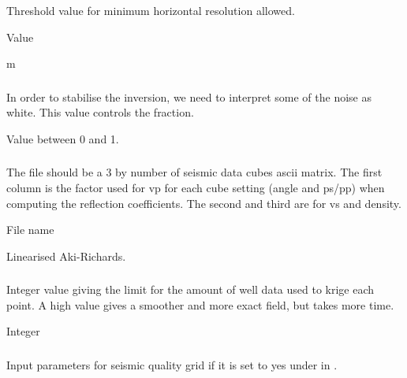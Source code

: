 \subsubsection{}
 \slist
   \item \Description Threshold value for minimum horizontal resolution allowed.
   \item \Argument Value
   \item {} m
 \elist

 \subsubsection{}
 \slist
   \item \Description In order to stabilise the inversion, we need to interpret some of the noise as white. This value controls the fraction.
   \item \Argument Value between 0 and 1.
   \item {}
 \elist

\subsubsection{}
\slist
   \item \Description The file should be a 3 by  number of seismic data cubes ascii matrix. The first column is the factor used for vp for each cube setting (angle and ps/pp) when computing the reflection coefficients. The second and third are for vs and density.
   \item \Argument File name
   \item \Default Linearised Aki-Richards.
 \elist

\subsubsection{}
 \slist
   \item \Description Integer value giving the limit for the amount of well data used to krige each point. A high value gives a smoother and more exact field, but takes more time.
   \item \Argument Integer
   \item {}
 \elist

\subsubsection{}
 \slist
   \item \Description Input parameters for seismic quality grid if it is set to yes under  in .
   \item \Argument
   \item \Default
 \elist

